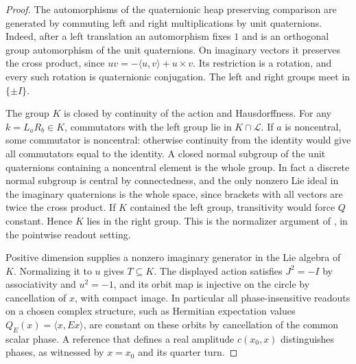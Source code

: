 \documentclass[11pt,reqno]{amsart}
\theoremstyle{definition}
\theoremstyle{remark}
\numberwithin{equation}{section}
\begin{document}
\begin{proof}
The automorphisms of the quaternionic heap preserving comparison are
generated by commuting left and right multiplications by unit
quaternions. Indeed, after a left translation an automorphism fixes \(1\)
and is an orthogonal group automorphism of the unit quaternions.
On imaginary vectors it preserves the cross product, since
\(uv=-\langle u,v\rangle+u\times v\). Its restriction is a rotation,
and every such rotation is quaternionic conjugation. The left
and right groups meet in \(\{\pm I\}\).

The group \(K\) is closed by continuity of the action and Hausdorffness.
For any \(k=L_aR_b\in K\), commutators with the left group lie in
\(K\cap\mathcal L\). If \(a\) is noncentral, some commutator is
noncentral: otherwise continuity from the identity would give
all commutators equal to the identity. A closed normal subgroup of
the unit quaternions containing a noncentral element is the whole
group. In fact a discrete normal subgroup is central by connectedness,
and the only nonzero Lie ideal in the imaginary quaternions is
the whole space, since brackets with all vectors are twice the
cross product. If \(K\) contained the left group, transitivity would
force \(Q\) constant. Hence \(K\) lies in the right group. This is
the normalizer argument of \cite[Lemma~22]{Companion}, in
the pointwise readout setting.

Positive dimension supplies a nonzero imaginary generator in the
Lie algebra of \(K\). Normalizing it to \(u\) gives \(T\subseteq K\).
The displayed action satisfies \(J^2=-I\) by associativity and
\(u^2=-1\), and its orbit map is injective on the circle by cancellation
of \(x\), with compact image. In particular all phase-insensitive
readouts on a chosen complex structure, such as Hermitian expectation
values \(Q_E(x)=\langle x,Ex\rangle\), are constant on these orbits
by cancellation of the common scalar phase. A reference that defines
a real amplitude \(c(x_0,x)\) distinguishes phases, as witnessed by
\(x=x_0\) and its quarter turn.


\end{proof}
\end{document}
